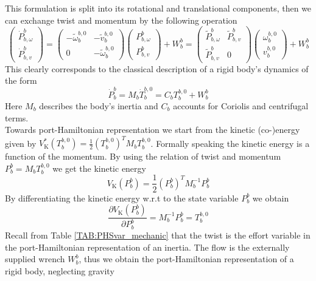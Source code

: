 \documentclass[a4paper,twoside, openright,12pt]{report}
\newcommand{\g}[1]{\text{#1}}
\begin{document}
This formulation is split into its rotational and translational components, then we can exchange twist and momentum by the following operation
\begin{equation}\label{EQ:centripetaldetail}
\begin{pmatrix}
\dot{P}_{b,\omega}^b \\ \dot{P}_{b,v}^b \end{pmatrix} = \begin{pmatrix}
-\tilde{\omega}_b^{b,0} & -\tilde{v}_b^{b,0} \\ 0 & -\tilde{\omega}_b^{b,0}\end{pmatrix} \begin{pmatrix}
P_{b,\omega}^b \\ P_{b,v}^b 
\end{pmatrix} + W_b^b = \begin{pmatrix}
\tilde{P}_{b,\omega}^b & \tilde{P}_{b,v}^b \\ \tilde{P}_{b,v}^b & 0
\end{pmatrix} \begin{pmatrix}
\omega_b^{b,0} \\ v_b^{b,0}
\end{pmatrix} +W_b^b
\end{equation}
This clearly corresponds to the classical description of a rigid body's dynamics of the form
\begin{equation}
	\dot{P}_b^b = M_b \dot{T}_b^{b,0}  = C_b T_b^{b,0} + W_{b}^b
\end{equation}
Here $M_b$ describes the body's inertia and $C_b$ accounts for Coriolis and centrifugal terms.\\
Towards port-Hamiltonian representation we start from the kinetic (co-)energy given by $V_\g{K}^*(T_b^{b,0}) =\frac{1}{2}(T_b^{b,0})^T M_b T_b^{b,0}$. Formally speaking the kinetic energy is a function of the momentum. By using the relation of twist and momentum $P_b^b = M_b T_b^{b,0}$ we get the kinetic energy
\begin{equation}
V_\g{K}(P_b^b) = \frac{1}{2}(P_b^b)^T M_b^{-1} P_b^b
\end{equation}
By differentiating the kinetic energy w.r.t to the state variable $P_b^b$ we obtain 
\begin{equation}
\frac{\partial V_\g{K}(P_b^b)}{\partial P_b^b} = M_b^{-1} P_b^b = T_b^{b,0}
\end{equation}
Recall from Table \ref{TAB:PHSvar_mechanic} that the twist is the effort variable in the port-Hamiltonian representation of an inertia. The flow is the externally supplied wrench $W_b^b$, thus we obtain the port-Hamiltonian representation of a rigid body, neglecting gravity
\end{document}
